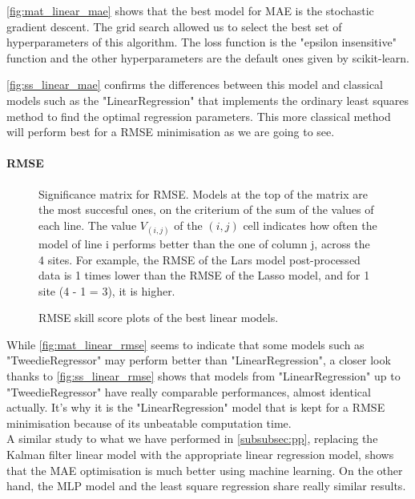 \autoref{fig:mat_linear_mae} shows that the best model for MAE is the stochastic gradient descent. 
The grid search allowed us to select the best set of hyperparameters of this algorithm.
The loss function is the "epsilon insensitive" function and the other hyperparameters are the default ones given by scikit-learn.

\autoref{fig:ss_linear_mae} confirms the differences between this model and classical models such as the "LinearRegression" that implements the ordinary least squares method to find the optimal regression parameters. This more classical method will perform best for a RMSE minimisation as we are going to see.
\newpage
\paragraph{RMSE}\indent
\begin{figure}[htb!]
    \centering
    
\caption{Significance matrix for RMSE. Models at the top of the matrix are the most succesful ones, on the criterium of the sum of the values of each line. The value $V_{(i,j)}$ of the $(i,j)$ cell indicates how often the model of line i performs better than the one of column j, across the 
4 sites. For example, the RMSE of the Lars model post-processed data is 1 times lower than the RMSE of the Lasso model, and for 1 site (4 - 1 = 3), it is higher.}
\label{fig:mat_linear_rmse}
\end{figure}
\newpage
\begin{figure}[htb!]
    \centering
    
\caption{RMSE skill score plots of the best linear models.}
\label{fig:ss_linear_rmse}
\end{figure}

While \autoref{fig:mat_linear_rmse} seems to indicate that some models such as "TweedieRegressor" may perform better than "LinearRegression", a closer look thanks to \autoref{fig:ss_linear_rmse} shows that models from "LinearRegression" up to "TweedieRegressor" have really comparable performances, almost identical actually. It's why it is the "LinearRegression" model that is kept for a RMSE minimisation because of its unbeatable computation time.\\

A similar study to what we have performed in \autoref{subsubsec:pp}, replacing the Kalman filter linear model with the appropriate linear regression model, shows that the MAE optimisation is much better using machine learning. On the other hand, the MLP model and the least square regression share really similar results.

